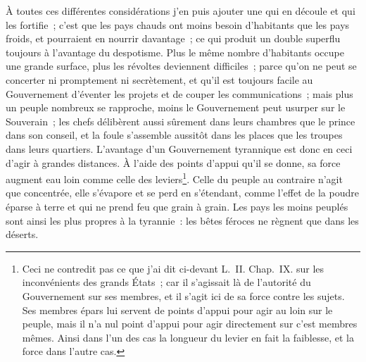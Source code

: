\documentclass[french,twoside]{book} %
\begin{document}
À toutes ces différentes considérations j’en puis ajouter une qui en découle et qui les fortifie ; c’est que les pays chauds ont moins besoin d’habitants que les pays froids, et pourraient en nourrir davantage ; ce qui produit un double superflu toujours à l’avantage du despotisme. Plus le même nombre d’habitants occupe une grande surface, plus les révoltes deviennent difficiles ; parce qu’on ne peut se concerter ni promptement ni secrètement, et qu’il est toujours facile au Gouvernement d’éventer les projets et de couper les communications ; mais plus un peuple nombreux se rapproche, moins le Gouvernement peut usurper sur le Souverain ; les chefs délibèrent aussi sûrement dans leurs chambres que le prince dans son conseil, et la foule s’assemble aussitôt dans les places que les troupes dans leurs quartiers. L’avantage d’un Gouvernement tyrannique est donc en ceci d’agir à grandes distances. À l’aide des points d’appui qu’il se donne, sa force augment eau loin comme celle des leviers\footnote{Ceci ne contredit pas ce que j’ai dit ci-devant L. II. Chap. IX. sur les inconvénients des grands États ; car il s’agissait là de l’autorité du Gouvernement sur ses membres, et il s’agit ici de sa force contre les sujets. Ses membres épars lui servent de points d’appui pour agir au loin sur le peuple, mais il n’a nul point d’appui pour agir directement sur c’est membres mêmes. Ainsi dans l’un des cas la longueur du levier en fait la faiblesse, et la force dans l’autre cas.}. Celle du peuple au contraire n’agit que concentrée, elle s’évapore et se perd en s’étendant, comme l’effet de la poudre éparse à terre et qui ne prend feu que grain à grain. Les pays les moins peuplés sont ainsi les plus propres à la tyrannie : les bêtes féroces ne règnent que dans les déserts.
\end{document}
